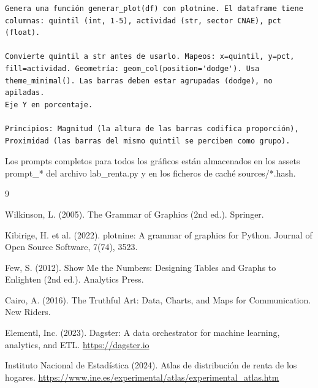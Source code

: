 \documentclass[spanish,a4paper,12pt,oneside]{extreport}
\begin{document}
\begin{lstlisting}[language={},caption={Prompt para el grouped bar de actividad por quintil.}]
Genera una función generar_plot(df) con plotnine. El dataframe tiene
columnas: quintil (int, 1-5), actividad (str, sector CNAE), pct (float).

Convierte quintil a str antes de usarlo. Mapeos: x=quintil, y=pct,
fill=actividad. Geometría: geom_col(position='dodge'). Usa
theme_minimal(). Las barras deben estar agrupadas (dodge), no apiladas.
Eje Y en porcentaje.

Principios: Magnitud (la altura de las barras codifica proporción),
Proximidad (las barras del mismo quintil se perciben como grupo).
\end{lstlisting}

\bigskip

\noindent Los prompts completos para todos los gráficos están almacenados en los assets prompt\_* del archivo lab\_renta.py y en los ficheros de caché sources/*.hash.



\begin{thebibliography}{9}

Wilkinson, L. (2005). The Grammar of Graphics (2nd ed.). Springer.

Kibirige, H. et al. (2022). plotnine: A grammar of graphics for Python. Journal of Open Source Software, 7(74), 3523.

Few, S. (2012). Show Me the Numbers: Designing Tables and Graphs to Enlighten (2nd ed.). Analytics Press.

Cairo, A. (2016). The Truthful Art: Data, Charts, and Maps for Communication. New Riders.

Elementl, Inc. (2023). Dagster: A data orchestrator for machine learning, analytics, and ETL. \url{https://dagster.io}

Instituto Nacional de Estadística (2024). Atlas de distribución de renta de los hogares. \url{https://www.ine.es/experimental/atlas/experimental_atlas.htm}

\end{thebibliography}
\end{document}
